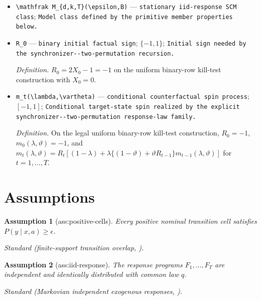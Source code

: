 \documentclass{article}
\newtheorem{assumption}{Assumption}
\begin{document}
\begin{itemize}
  \item \texttt{\textbackslash{}\allowbreak{}mathfrak M\_\allowbreak{}\{d,\allowbreak{}k,\allowbreak{}T\}\allowbreak{}(\textbackslash{}\allowbreak{}epsilon,\allowbreak{}B)} --- \texttt{stationary iid-\allowbreak{}response SCM class}; \texttt{Model class defined by the primitive member properties below.}
  \item \texttt{R\_\allowbreak{}0} --- \texttt{binary initial factual sign}; \(\{-1,1\}\); \texttt{Initial sign needed by the synchronizer-\allowbreak{}-\allowbreak{}two-\allowbreak{}permutation recursion.}
  \par\smallskip\noindent\emph{Definition.} \(R_0=2X_0-1=-1\) on the uniform binary-row kill-test construction with \(X_0=0\).
  \item \texttt{m\_\allowbreak{}t(\textbackslash{}\allowbreak{}lambda,\allowbreak{}\textbackslash{}\allowbreak{}vartheta)} --- \texttt{conditional counterfactual spin process}; \([-1,1]\); \texttt{Conditional target-\allowbreak{}state spin realized by the explicit synchronizer-\allowbreak{}-\allowbreak{}two-\allowbreak{}permutation response-\allowbreak{}law family.}
  \par\smallskip\noindent\emph{Definition.} On the legal uniform binary-row kill-test construction, \(R_0=-1\), \(m_0(\lambda,\vartheta)=-1\), and \(m_t(\lambda,\vartheta)=R_t[(1-\lambda)+\lambda\{(1-\vartheta)+\vartheta R_{t-1}\}m_{t-1}(\lambda,\vartheta)]\) for \(t=1,\ldots,T\).
\end{itemize}

\section{Assumptions}

\begin{assumption}[ass:positive-cells]\label{ass:positive-cells}
Every positive nominal transition cell satisfies \(P(y\mid x,a)\ge\epsilon\).
\par\smallskip\noindent\emph{Standard} (finite-support transition overlap, \cite{LallyKazemiPaoletti2026RobustCounterfactualMDP}).
\end{assumption}

\begin{assumption}[ass:iid-response]\label{ass:iid-response}
The response programs \(F_1,\ldots,F_T\) are independent and identically distributed with common law \(q\).
\par\smallskip\noindent\emph{Standard} (Markovian independent exogenous responses, \cite{ZhangTianBareinboim2022PartialCounterfactual}).
\end{assumption}
\end{document}
